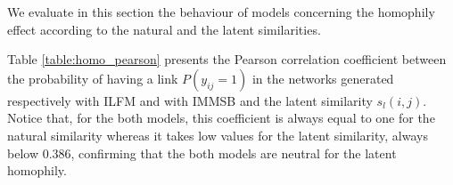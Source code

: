 \documentclass[a4paper, 12pt]{article}
\begin{document}
%
%


We evaluate in this section the behaviour of models concerning the homophily effect according to  the natural and the latent similarities.

Table \ref{table:homo_pearson} presents the Pearson correlation coefficient between the probability of having a link $P(y_{ij}=1)$ in the networks generated respectively with ILFM and with IMMSB  and the latent similarity $s_l(i,j)$. Notice that, for the both models, this coefficient  is always equal to one for the natural similarity whereas it takes low values for the latent similarity, always below 0.386, confirming that the both models are neutral for the latent homophily.
\end{document}
